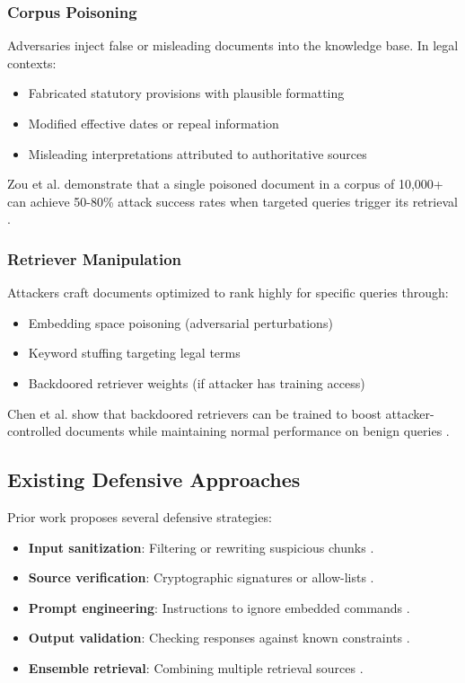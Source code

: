 \documentclass[conference]{IEEEtran}
\begin{document}
\subsubsection{Corpus Poisoning}
Adversaries inject false or misleading documents into the knowledge base. In legal contexts:
\begin{itemize}
    \item Fabricated statutory provisions with plausible formatting
    \item Modified effective dates or repeal information
    \item Misleading interpretations attributed to authoritative sources
\end{itemize}

Zou et al. demonstrate that a single poisoned document in a corpus of 10,000+ can achieve 50-80\% attack success rates when targeted queries trigger its retrieval \cite{b2}.

\subsubsection{Retriever Manipulation}
Attackers craft documents optimized to rank highly for specific queries through:
\begin{itemize}
    \item Embedding space poisoning (adversarial perturbations)
    \item Keyword stuffing targeting legal terms
    \item Backdoored retriever weights (if attacker has training access)
\end{itemize}

Chen et al. show that backdoored retrievers can be trained to boost attacker-controlled documents while maintaining normal performance on benign queries \cite{b1}.

\subsection{Existing Defensive Approaches}

Prior work proposes several defensive strategies:
\begin{itemize}
    \item \textbf{Input sanitization}: Filtering or rewriting suspicious chunks \cite{b3}.
    \item \textbf{Source verification}: Cryptographic signatures or allow-lists \cite{b5}.
    \item \textbf{Prompt engineering}: Instructions to ignore embedded commands \cite{b6}.
    \item \textbf{Output validation}: Checking responses against known constraints \cite{b7}.
    \item \textbf{Ensemble retrieval}: Combining multiple retrieval sources \cite{b8}.
\end{itemize}
\end{document}
